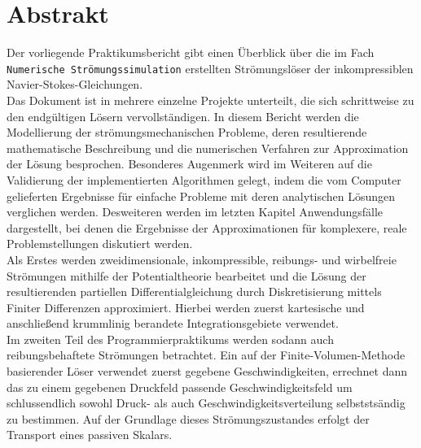 \chapter*{Abstrakt}
\flushleft
Der vorliegende Praktikumsbericht gibt einen \"Uberblick \"uber die im Fach \texttt{Numerische Str\"omungssimulation} erstellten Str\"omungsl\"oser der inkompressiblen Navier-Stokes-Gleichungen. \\ [0.5cm]

Das Dokument ist in mehrere einzelne Projekte unterteilt, die sich schrittweise zu den endg\"ultigen L\"osern vervollst\"andigen. In diesem Bericht werden die Modellierung der str\"omungsmechanischen Probleme, deren resultierende mathematische Beschreibung und die numerischen Verfahren zur Approximation der L\"osung besprochen. Besonderes Augenmerk wird im Weiteren auf  die Validierung der implementierten Algorithmen gelegt, indem die vom Computer gelieferten Ergebnisse f\"ur einfache Probleme mit deren analytischen L\"osungen verglichen werden. Desweiteren werden im letzten Kapitel Anwendungsf\"alle dargestellt, bei denen die Ergebnisse der Approximationen f\"ur komplexere, reale Problemstellungen diskutiert werden. \\[1cm]

Als Erstes werden zweidimensionale, inkompressible, reibungs- und wirbelfreie Str\"omungen mithilfe der Potentialtheorie bearbeitet und die L\"osung der resultierenden partiellen Differentialgleichung durch Diskretisierung mittels Finiter Differenzen approximiert. Hierbei werden zuerst kartesische und anschlie\ss{}end krummlinig berandete Integrationsgebiete verwendet. \\ [0.5cm]

Im zweiten Teil des Programmierpraktikums werden sodann auch reibungsbehaftete Str\"omungen betrachtet. Ein auf der Finite-Volumen-Methode basierender L\"oser verwendet zuerst gegebene Geschwindigkeiten, errechnet dann das zu einem gegebenen Druckfeld passende Geschwindigkeitsfeld um schlussendlich sowohl Druck- als auch Geschwindigkeitsverteilung selbststs\"andig zu bestimmen. Auf der Grundlage dieses Str\"omungszustandes erfolgt der Transport eines passiven Skalars.
